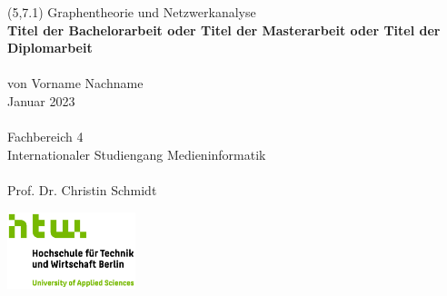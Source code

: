 \begin{titlepage}

\begingroup
\begin{textblock}{6}(5,7.1)
\setlength{\parindent}{0pt}
\fontsize{10pt}{1.1em}\selectfont
Graphentheorie und Netzwerkanalyse
\vspace{0.1cm}
\\
\LARGE
{\color{htwgreen}
\textbf{Titel der Bachelorarbeit oder Titel der Masterarbeit oder Titel der Diplomarbeit}
}\\\\
\fontsize{10pt}{1.1em}\selectfont
von Vorname Nachname\\
Januar 2023\\\\
Fachbereich 4\\
Internationaler Studiengang Medieninformatik\\\\
Prof. Dr. Christin Schmidt\\
\end{textblock}
\endgroup
     
\vfill
        
\begin{center}
\includegraphics[width=0.28\textwidth,keepaspectratio]{images/HTW_Logo_rgb.jpg}
\end{center}

\end{titlepage}